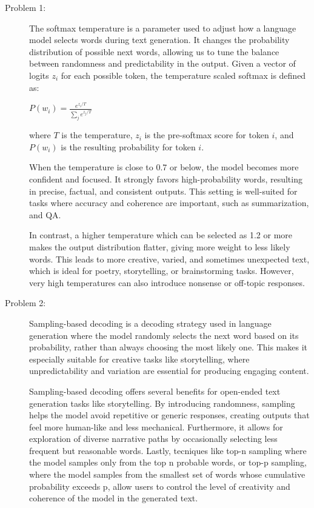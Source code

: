 \documentclass[10pt]{article}
\begin{document}
\begin{description}
\item[Problem 1:] \hfill %

The softmax temperature is a parameter used to adjust how a language model selects words during text generation. 
It changes the probability distribution of possible next words, allowing us to tune the balance between randomness and predictability in the output.
Given a vector of logits $z_i$ for each possible token, the temperature scaled softmax is defined as:

\begin{center}
    $\displaystyle{P(w_i) = \frac{e^{z_i / T}}{\sum_{j} e^{z_j / T}}}$
\end{center}

where $T$ is the temperature, $z_i$ is the pre-softmax score for token $i$, and $P(w_i)$ is the resulting probability for token $i$.

When the temperature is close to 0.7 or below, the model becomes more confident and focused. 
It strongly favors high-probability words, resulting in precise, factual, and consistent outputs. 
This setting is well-suited for tasks where accuracy and coherence are important, 
such as summarization, and QA.

In contrast, a higher temperature which can be selected as 1.2 or more makes the output distribution flatter, 
giving more weight to less likely words. This leads to more creative, varied, and sometimes unexpected text, 
which is ideal for poetry, storytelling, or brainstorming tasks. 
However, very high temperatures can also introduce nonsense or off-topic responses.

\item[Problem 2:] \hfill %

Sampling-based decoding is a decoding strategy used in language generation where the model randomly selects the next word 
based on its probability, rather than always choosing the most likely one. This makes it especially suitable for creative tasks 
like storytelling, where unpredictability and variation are essential for producing engaging content.

Sampling-based decoding offers several benefits for open-ended text generation tasks like storytelling.
By introducing randomness, sampling helps the model avoid repetitive or generic responses, creating outputs 
that feel more human-like and less mechanical.
Furthermore, it allows for exploration of diverse narrative paths by occasionally selecting less frequent but reasonable words.
Lastly, tecniques like top-n sampling where the model samples only from the top n probable words, or top-p sampling, where the model samples 
from the smallest set of words whose cumulative probability exceeds p, allow users to control the level of creativity and coherence of the model in the generated text.


\end{description}
\end{document}
